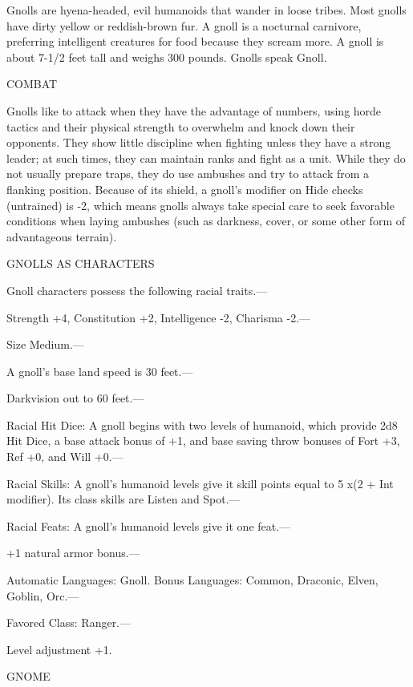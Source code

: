 \documentclass{article}
\begin{document}
Gnolls are hyena-headed, evil humanoids that wander in loose tribes. Most gnolls 
have dirty yellow or reddish-brown fur. A gnoll is a nocturnal carnivore, preferring 
intelligent creatures for food because they scream more. A gnoll is about 7-1/2 
feet tall and weighs 300 pounds. Gnolls speak Gnoll.

COMBAT

Gnolls like to attack when they have the advantage of numbers, using horde tactics 
and their physical strength to overwhelm and knock down their opponents. They show 
little discipline when fighting unless they have a strong leader; at such times, 
they can maintain ranks and fight as a unit. While they do not usually prepare 
traps, they do use ambushes and try to attack from a flanking position. Because 
of its shield, a gnoll's modifier on Hide checks (untrained) is -2, which means 
gnolls always take special care to seek favorable conditions when laying ambushes 
(such as darkness, cover, or some other form of advantageous terrain).

GNOLLS AS CHARACTERS

Gnoll characters possess the following racial traits.---

Strength +4, Constitution +2, Intelligence -2, Charisma -2.---

Size Medium.---

A gnoll's base land speed is 30 feet.---

Darkvision out to 60 feet.---

Racial Hit Dice: A gnoll begins with two levels of humanoid, which provide 2d8 
Hit Dice, a base attack bonus of +1, and base saving throw bonuses of Fort +3, 
Ref +0, and Will +0.---

Racial Skills: A gnoll's humanoid levels give it skill points equal to 5 x$ $(2 
+ Int modifier). Its class skills are Listen and Spot.---

Racial Feats: A gnoll's humanoid levels give it one feat.--- 

\parindent=3pt
+1 natural armor bonus.---

\parindent=0pt
Automatic Languages: Gnoll. Bonus Languages: Common, Draconic, Elven, Goblin, Orc.---

Favored Class: Ranger.---

Level adjustment +1.

\vspace{12pt}
{\LARGE{}GNOME}
\end{document}
